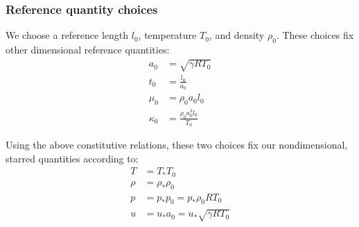 \documentclass[letterpaper,11pt,nointlimits]{amsart}
\begin{document}
\subsubsection{Reference quantity choices}

We choose a reference length $l_{0}$, temperature $T_{0}$,
and density $\rho_{0}$.  These choices fix other dimensional
reference quantities:
\begin{align*}
  a_{0} &= \sqrt{\gamma{}RT_{0}}
  \\
  t_{0} &= \frac{l_{0}}{a_{0}}
  \\
  \mu_{0} &= \rho_{0} a_{0} l_{0}
  \\
  \kappa_{0} &= \frac{\rho_{0} a_{0}^{3} l_{0}}{T_{0}}
\end{align*}

Using the above constitutive relations, these two choices fix our
nondimensional, starred quantities according to:
\begin{align}
  T &= T_{*} T_{0}
  \\
  \rho &= \rho_{*} \rho_{0}
  \\
  p &= p_{*} p_{0} = p_{*} \rho_{0} R T_{0}
  \\
  u &= u_{*} a_{0} = u_{*} \sqrt{\gamma{}RT_{0}}
  \label{eq:refquantities}
\end{align}
\end{document}
